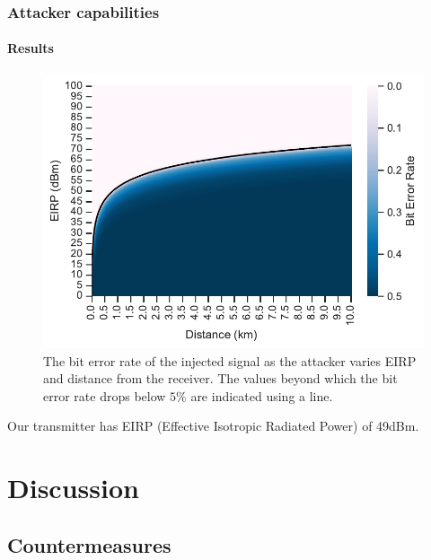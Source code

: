 \documentclass{beamer}
\begin{document}
\begin{frame}
  \frametitle{Attacker capabilities}
  \framesubtitle{Results}
  \begin{figure}
      \centering
      \includegraphics[width=0.6\columnwidth]{images/distance_eirp_heatmap_95.pdf}
      \caption{The bit error rate of the injected signal as the attacker varies EIRP and distance from the receiver. The values beyond which the bit error rate drops below $5$\% are indicated using a line.}
      \label{fig:distance_eirp}
  \end{figure}
  Our transmitter has EIRP (Effective Isotropic Radiated Power) of 49dBm.
\end{frame}

\section{Discussion}

\subsection{Countermeasures}
\end{document}
